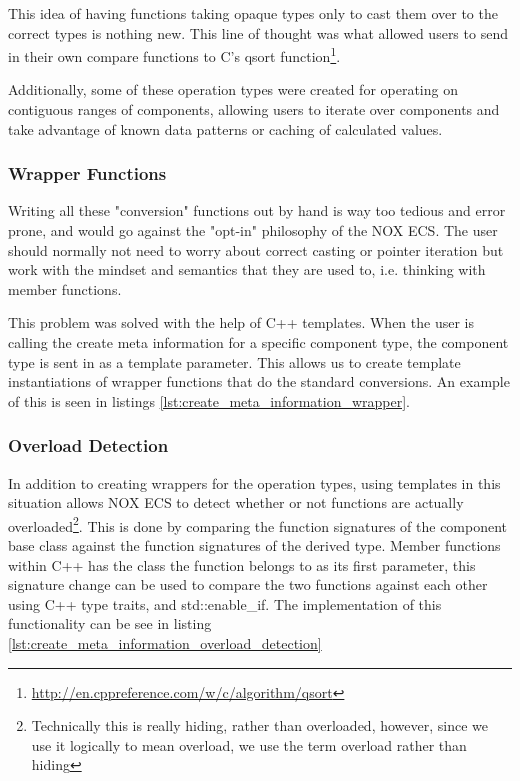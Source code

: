 This idea of having functions taking opaque types only to cast them over to the correct types is nothing new.
This line of thought was what allowed users to send in their own compare functions to C's qsort function\footnote{\url{http://en.cppreference.com/w/c/algorithm/qsort}}.

Additionally, some of these operation types were created for operating on contiguous ranges of components,
allowing users to iterate over components and take advantage of known data patterns or caching of calculated values.

\subsubsection{Wrapper Functions}
Writing all these "conversion" functions out by hand is way too tedious and error prone, and would go against the "opt-in" philosophy of the NOX ECS.
The user should normally not need to worry about correct casting or pointer iteration but work with the mindset and semantics that they are used to, i.e. thinking with member functions.

This problem was solved with the help of C++ templates.
When the user is calling the create meta information for a specific component type,
the component type is sent in as a template parameter.
This allows us to create template instantiations of wrapper functions that do the standard conversions.
An example of this is seen in listings \ref{lst:create_meta_information_wrapper}.


\subsubsection{Overload Detection}
In addition to creating wrappers for the operation types, using templates in this situation
allows NOX ECS to detect whether or not functions are actually overloaded\footnote{Technically this is really hiding, rather than overloaded, however, since we use it logically to mean overload, we use the term overload rather than hiding}.
This is done by comparing the function signatures of the component base class against the function signatures of the derived type.
Member functions within C++ has the class the function belongs to as its first parameter\cite{iso_cpp_member_function_pointers},
this signature change can be used to compare the two functions against each other using C++ type traits, and std::enable\_if.
The implementation of this functionality can be see in listing \ref{lst:create_meta_information_overload_detection}

